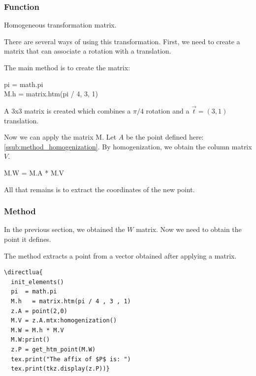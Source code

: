 \subsubsection{Function }
\label{ssub:method_htm}
Homogeneous transformation matrix.

There are several ways of using this transformation. First, we need to create a matrix that can associate a rotation with a translation.

The main method is to create the matrix:

\begin{mybox}
  pi  = math.pi\\
  M.h   = matrix.htm(pi / 4, 3, 1)
\end{mybox}

A 3x3 matrix is created which combines a $\pi/4$ rotation and a $\overrightarrow{t}=(3,1)$ translation.



Now we can apply the matrix M. Let $A$ be the point defined here: \ref{ssub:method_homogenization}. By homogenization, we obtain the column matrix $V$.


\begin{mybox}
M.W = M.A * M.V
\end{mybox}


All that remains is to extract the coordinates of the new point.

\subsubsection{Method }
\label{ssub:method_get_htm_point}

In the previous section, we obtained the $W$ matrix. Now we need to obtain the point it defines.

The  method   extracts a point from a vector obtained after applying a  matrix.

\begin{minipage}{.5\textwidth}
\begin{verbatim}
\directlua{
  init_elements()
  pi  = math.pi
  M.h   = matrix.htm(pi / 4 , 3 , 1)
  z.A = point(2,0)
  M.V = z.A.mtx:homogenization()
  M.W = M.h * M.V
  M.W:print()
  z.P = get_htm_point(M.W)
  tex.print("The affix of $P$ is: ")
  tex.print(tkz.display(z.P))}
\end{verbatim}
\end{minipage}
\begin{minipage}{.5\textwidth}
\end{minipage}

